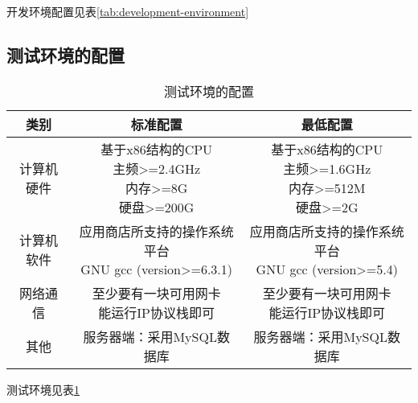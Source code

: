 开发环境配置见表\ref{tab:development-environment}

\subsection{测试环境的配置}
\begin{table}[htbp]
\centering
\caption{测试环境的配置} \label{tab:test-environment}
\begin{tabular}{|c|c|c|}
    \hline
    类别 & 标准配置 & 最低配置 \\
    \hline
    计算机硬件 & \tabincell{c}{基于x86结构的CPU\\ 主频>=2.4GHz\\ 内存>=8G\\ 硬盘>=200G} & \tabincell{c}{基于x86结构的CPU\\ 主频>=1.6GHz\\ 内存>=512M\\ 硬盘>=2G} \\
    \hline
    计算机软件 & \tabincell{c}{应用商店所支持的操作系统平台\\ GNU gcc (version>=6.3.1)} & \tabincell{c}{应用商店所支持的操作系统平台\\ GNU gcc (version>=5.4)} \\
    \hline
    网络通信 & \tabincell{c}{至少要有一块可用网卡\\ 能运行IP协议栈即可} & \tabincell{c}{至少要有一块可用网卡\\ 能运行IP协议栈即可} \\
    \hline
    其他 & 服务器端：采用MySQL数据库 & 服务器端：采用MySQL数据库 \\
    \hline

\end{tabular}
\end{table}

测试环境见表\ref{tab:test-environment}

